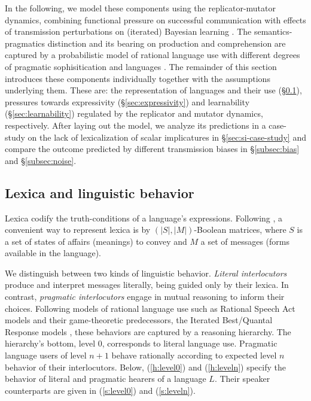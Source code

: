 \documentclass[a4paper]{article}
\begin{document}
In the following, we model these components using the replicator-mutator dynamics, combining functional pressure on successful communication with effects of transmission perturbations on (iterated) Bayesian learning \citep{griffiths+kalish:2007}. The semantics-pragmatics distinction and its bearing on production and comprehension are captured by a probabilistic model of rational language use with different degrees of pragmatic sophisitication and languages \citep{frank+goodman:2012,franke+jaeger:2014, bergen+etal:2016}. The remainder of this section introduces these components individually together with the assumptions underlying them. These are: the representation of languages and their use (\S\ref{sec:languages+use}), pressures towards expressivity (\S\ref{sec:expressivity}) and learnability (\S\ref{sec:learnability}) regulated by the replicator and mutator dynamics, respectively. After laying out the model, we analyze its predictions in a case-study on the lack of lexicalization of scalar implicatures in \S\ref{sec:si-case-study} and compare the outcome predicted by different transmission biases in \S\ref{subsec:bias} and \S\ref{subsec:noise}.  



\subsection{Lexica and linguistic behavior}\label{sec:languages+use}
Lexica codify the truth-conditions of a language's expressions. Following \citet{franke+jaeger:2014}, a convenient way to represent lexica is by $(|S|,|M|)$-Boolean matrices, where $S$ is a set of states of affairs (meanings) to convey and $M$ a set of messages (forms available in the language).

We distinguish between two kinds of linguistic behavior. {\em Literal interlocutors} produce and interpret messages literally, being guided only by their lexica. In contrast, {\em pragmatic interlocutors} engage in mutual reasoning to inform their choices. Following models of rational language use such as Rational Speech Act models \citep{frank+goodman:2012} and their game-theoretic predecessors, the Iterated Best/Quantal Response models \citep{franke:2009,franke+jaeger:2014}, these behaviors are captured by a reasoning hierarchy. The hierarchy's bottom, level $0$, corresponds to literal language use. Pragmatic language users of level $n + 1$ behave rationally according to expected level $n$ behavior of their interlocutors. Below, (\ref{h:level0}) and (\ref{h:leveln}) specify the behavior of literal and pragmatic hearers of a language $L$. Their speaker counterparts are given in (\ref{s:level0}) and (\ref{s:leveln}).
\end{document}
